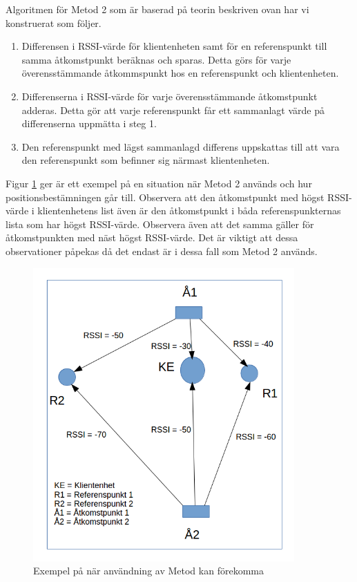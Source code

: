\documentclass[a4paper,12pt]{article}
\begin{document}
 Algoritmen för Metod 2 som är baserad på teorin beskriven ovan har vi konstruerat som följer.

 \begin{enumerate}
   \item Differensen i RSSI-värde för klientenheten samt för en referenspunkt till samma åtkomstpunkt beräknas och sparas. Detta görs för varje överensstämmande åtkommspunkt hos en referenspunkt och klientenheten.
   \item Differenserna i RSSI-värde för varje överensstämmande åtkomstpunkt adderas. Detta gör att varje referenspunkt får ett sammanlagt värde på differenserna uppmätta i steg 1.
   \item Den referenspunkt med lägst sammanlagd differens uppskattas till att vara den referenspunkt som befinner sig närmast klientenheten.
 \end{enumerate}


 Figur \ref{fig:MET2} ger är ett exempel på en situation när Metod 2 används och hur positionsbestämningen går till. Observera att den åtkomstpunkt med högst RSSI-värde i klientenhetens list även är den åtkomstpunkt i båda referenspunkternas lista som har högst RSSI-värde. Observera även att det samma gäller för åtkomstpunkten med näst högst RSSI-värde. Det är viktigt att dessa observationer påpekas då det endast är i dessa fall som Metod 2 används.

 \begin{figure}[H]
   \centering
   \includegraphics[width=10cm]{media/MET2.png}
   \caption{Exempel på när användning av Metod kan förekomma}
   \label{fig:MET2}
 \end{figure}
\end{document}

